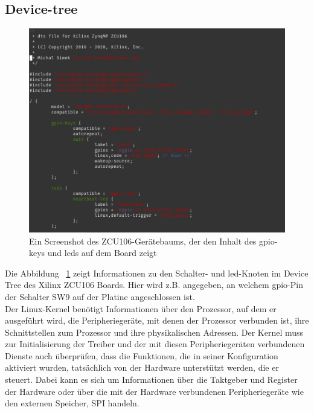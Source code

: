 \subsection{Device-tree}
\begin{figure}[h]
	\begin{center}
		\includegraphics[width=1.1\textwidth]{./images/device-tree.jpg}
	\end{center}
	\vspace{-5pt}
	\caption[ZCU106-Gerätbaum gpio-keys and leds]{Ein Screenshot des ZCU106-Gerätebaums, der den Inhalt des gpio-keys und leds  auf dem Board zeigt} %
	\label{fig:device:tree}
	\vspace{-5pt}
\end{figure}	
Die Abbildung ~\ref{fig:device:tree} zeigt Informationen zu den Schalter- und led-Knoten im Device Tree des Xilinx ZCU106 Boards. Hier wird z.B. angegeben, an welchem gpio-Pin der Schalter SW9 auf der Platine angeschlossen ist.\\
\cite{Dervis2013}Der Linux-Kernel benötigt Informationen über den Prozessor, auf dem er ausgeführt wird, die Peripheriegeräte, mit denen der Prozessor verbunden ist, ihre Schnittstellen zum Prozessor und ihre physikalischen Adressen. Der Kernel muss zur Initialisierung der Treiber und der mit diesen Peripheriegeräten verbundenen Dienste auch überprüfen, dass die Funktionen, die in seiner Konfiguration aktiviert wurden, tatsächlich von der Hardware unterstützt werden, die er steuert. Dabei kann es sich um Informationen über die Taktgeber und Register der Hardware oder über die mit der Hardware verbundenen Peripheriegeräte wie den externen Speicher, SPI handeln.\\

